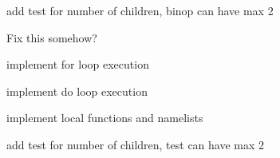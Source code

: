 
\begin{DoxyRefList}
\item[\label{todo__todo000001}%
\hypertarget{todo__todo000001}{}%
Class \hyperlink{classBinop}{Binop} ]add test for number of children, binop can have max 2  
\item[\label{todo__todo000004}%
\hypertarget{todo__todo000004}{}%
Member \hyperlink{classBinop_ac3cff65931eaf4d542fc50c1dc696f55}{Binop\+:\+:execute} (\hyperlink{classEnvironment}{Environment} \&env)]Fix this somehow?  
\item[\label{todo__todo000005}%
\hypertarget{todo__todo000005}{}%
Member \hyperlink{classLoop_a661edc5e6b0f90787e2a55922109f110}{Loop\+:\+:execute} (\hyperlink{classEnvironment}{Environment} \&env)]implement for loop execution 

implement do loop execution  
\item[\label{todo__todo000002}%
\hypertarget{todo__todo000002}{}%
Member \hyperlink{classNode_a8dad370be1595f49e0a7c2406a91e867}{Node\+:\+:Type} ]implement local functions and namelists  
\item[\label{todo__todo000003}%
\hypertarget{todo__todo000003}{}%
Class \hyperlink{classTest}{Test} ]add test for number of children, test can have max 2 
\end{DoxyRefList}